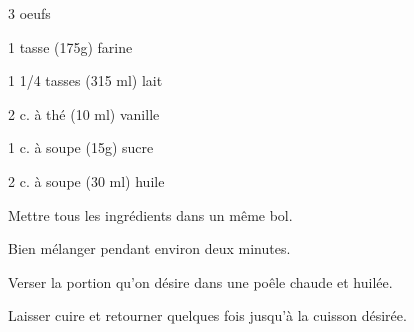 


\totaltime{}


\begin{ingredients}
    \item 3 oeufs
    \item 1 tasse (175g) farine
    \item 1 1/4 tasses (315 ml) lait
    \item 2 c. à thé (10 ml) vanille
    \item 1 c. à soupe (15g) sucre
    \item 2 c. à soupe (30 ml) huile
\end{ingredients}

\begin{steps}
    \item Mettre tous les ingrédients dans un même bol.
    \item Bien mélanger pendant environ deux minutes.
    \item Verser la portion qu'on désire dans une poêle chaude et huilée.
    \item Laisser cuire et retourner quelques fois jusqu'à la cuisson désirée.
\end{steps}
